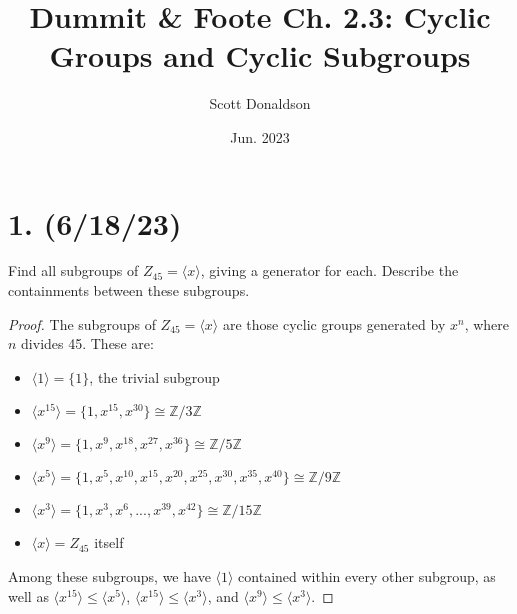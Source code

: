 \documentclass{article}
\title{Dummit \& Foote Ch. 2.3: Cyclic Groups and Cyclic Subgroups}
\author{Scott Donaldson}
\date{Jun. 2023}
\begin{document}
\maketitle

\section*{1. (6/18/23)}

Find all subgroups of $Z_{45} = \langle x \rangle$, giving a generator for each. Describe the containments between these subgroups.

\begin{proof}
    The subgroups of $Z_{45} = \langle x \rangle$ are those cyclic groups generated by $x^n$, where $n$ divides 45. These are:
    \begin{itemize}
        \item $\langle 1 \rangle = \{ 1 \}$, the trivial subgroup
        \item $\langle x^{15} \rangle = \{ 1, x^{15}, x^{30} \} \cong \mathbb{Z}/3\mathbb{Z}$
        \item $\langle x^9 \rangle = \{ 1, x^9, x^{18}, x^{27}, x^{36} \} \cong \mathbb{Z}/5\mathbb{Z}$
        \item $\langle x^5 \rangle = \{ 1, x^5, x^{10}, x^{15}, x^{20}, x^{25}, x^{30}, x^{35}, x^{40} \} \cong \mathbb{Z}/9\mathbb{Z}$
        \item $\langle x^3 \rangle = \{ 1, x^3, x^6, ..., x^{39}, x^{42} \} \cong \mathbb{Z}/15\mathbb{Z}$
        \item $\langle x \rangle = Z_{45}$ itself
    \end{itemize}
    Among these subgroups, we have $\langle 1 \rangle$ contained within every other subgroup, as well as $\langle x^{15} \rangle \leq \langle x^5 \rangle$, $\langle x^{15} \rangle \leq \langle x^3 \rangle$, and $\langle x^9 \rangle \leq \langle x^3 \rangle$.
\end{proof}
\end{document}
